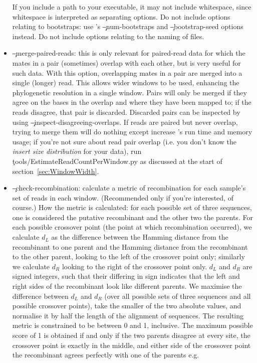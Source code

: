 \begin{itemize}
If you include a path to your \R executable, it may not include whitespace, since whitespace is interpreted as separating \R options.
Do not include options relating to bootstraps: use \pmt's \c{--num-bootstraps} and \c{--bootstrap-seed} options instead.
Do not include options relating to the naming of files.
\item \c{--merge-paired-reads}: this is only relevant for paired-read data for which the mates in a pair
(sometimes) overlap with each other, but is very useful for such data.
With this option, overlapping mates in a pair are merged into a single (longer) read.
This allows wider windows to be used, enhancing the phylogenetic resolution in a single window.
Pairs will only be merged if they agree on the bases in the overlap and where they have been mapped to; if the reads disagree, that pair is discarded.
Discarded pairs can be inspected by using \c{--inspect-disagreeing-overlaps}.
If reads are paired but never overlap, trying to merge them will do nothing except increase \pmt's run time and memory usage; if you're not sure about read pair overlap (i.e. you don't know the {\it insert size distribution} for your data), run \\\c{tools/EstimateReadCountPerWindow.py} as discussed at the start of section~\ref{sec:WindowWidth}.
\item \c{--check-recombination}: calculate a metric of recombination for each sample's set of reads in each window.
(Recommended only if you're interested, of course.)
How the metric is calculated: for each possible set of three sequences, one is considered the putative recombinant and the other two the parents.
For each possible crossover point (the point at which recombination occurred), we calculate $d_L$ as the difference between the Hamming distance from the recombinant to one parent and the Hamming distance from the recombinant to the other parent, looking to the left of the crossover point only; similarly we calculate $d_R$ looking to the right of the crossover point only.
$d_L$ and $d_R$ are signed integers, such that their differing in sign indicates that the left and right sides of the recombinant look like different parents.
We maximise the difference between $d_L$ and $d_R$ (over all possible sets of three sequences and all possible crossover points), take the smaller of the two absolute values, and normalise it by half the length of the alignment of sequences.
The resulting metric is constrained to be between 0 and 1, inclusive.
The maximum possible score of 1 is obtained if and only if the two parents disagree at every site, the crossover point is exactly in the middle, and either side of the crossover point the recombinant agrees perfectly with one of the parents e.g.\\

\end{itemize}
